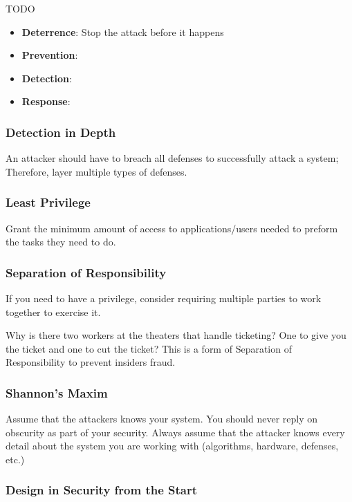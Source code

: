 \documentclass{article}
\begin{document}
{\color{red} TODO}
\begin{itemize}
    \item \textbf{Deterrence}: Stop the attack before it happens
    \item \textbf{Prevention}:
    \item \textbf{Detection}:
    \item \textbf{Response}:
\end{itemize}


\subsubsection{Detection in Depth}
An attacker should have to breach all defenses to successfully attack a system; Therefore, layer multiple types of defenses.

\subsubsection{Least Privilege}
Grant the minimum amount of access to applications/users needed to preform the tasks they need to do.

\subsubsection{Separation of Responsibility}
If you need to have a privilege, consider requiring multiple parties to work together to exercise it.

\begin{example}
    Why is there two workers at the theaters that handle ticketing? One to give you the ticket and one to cut the ticket? This is a form of Separation of Responsibility to prevent insiders fraud.
\end{example}

\subsubsection{Shannon's Maxim}
Assume that the attackers knows your system. You should never reply on obscurity as part of your security. Always assume that the attacker knows every detail about the system you are working with (algorithms, hardware, defenses, etc.)

\subsubsection*{Design in Security from the Start}
\end{document}

